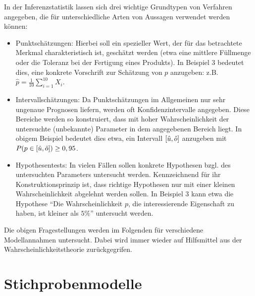 \documentclass{lecture}
\begin{document}
    In der Inferenzstatistik lassen sich drei wichtige Grundtypen von Verfahren angegeben, die für unterschiedliche Arten von Aussagen verwendet werden können:
    \begin{itemize}
        \item Punktschätzungen: Hierbei soll ein spezieller Wert, der für das betrachtete Merkmal charakteristisch ist, geschätzt werden (etwa eine mittlere Füllmenge oder die Toleranz bei der Fertigung eines Produkts).
        In Beispiel 3 bedeutet dies, eine konkrete Vorschrift zur Schätzung von \(p\) anzugeben: z.B. \(\hat{p} = \frac{1}{10}\sum_{i = 1}^{10}X_i\).
        \item  Intervallschätzungen: Da Punktschätzungen im Allgemeinen nur sehr ungenaue Prognosen liefern, werden oft Konfidenzintervalle angegeben.
        Diese Bereiche werden so konstruiert, dass mit hoher Wahrscheinlichkeit der untersuchte (unbekannte) Parameter in dem angegebenen Bereich liegt.
        In obigem Beispiel bedeutet dies etwa, ein Intervall \(\brackets*{\hat{u}, \hat{o}}\) anzugeben mit \(P\parentheses*{p \in \brackets*{\hat{u}, \hat{o}}} \ge 0,95\).
        \item  Hypothesentests: In vielen Fällen sollen konkrete Hypothesen bzgl. des untersuchten Parameters untersucht werden.
        Kennzeichnend für ihr Konstruktionsprinzip ist, dass richtige Hypothesen nur mit einer kleinen Wahrscheinlichkeit abgelehnt werden sollen.
        In Beispiel 3 kann etwa die Hypothese ``Die Wahrscheinlichkeit \(p\), die interessierende Eigenschaft zu haben, ist kleiner als \(5\%\)'' untersucht werden.
    \end{itemize}
    Die obigen Fragestellungen werden im Folgenden für verschiedene Modellannahmen untersucht.
    Dabei wird immer wieder auf Hilfsmittel aus der Wahrscheinlichkeitstheorie zurückgegrifen.


    \section*{Stichprobenmodelle}
\end{document}
